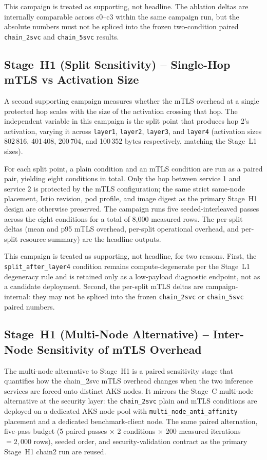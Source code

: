 This campaign is treated as supporting, not headline. The ablation deltas are internally
comparable across c0--c3 within the same campaign run, but the absolute numbers must not be
spliced into the frozen two-condition paired \texttt{chain\_2svc} and \texttt{chain\_5svc}
results.

\subsection{Stage~H1 (Split Sensitivity) -- Single-Hop mTLS vs Activation Size}
\label{sec:methods-rq21-splitsens}

A second supporting campaign measures whether the mTLS overhead at a single protected hop
scales with the size of the activation crossing that hop. The independent variable in this
campaign is the split point that produces hop 2's activation, varying it across
\texttt{layer1}, \texttt{layer2}, \texttt{layer3}, and \texttt{layer4} (activation sizes
802\,816, 401\,408, 200\,704, and 100\,352 bytes respectively, matching the Stage~L1 sizes).

For each split point, a plain condition and an mTLS condition are run as a paired pair,
yielding eight conditions in total. Only the hop between service 1 and service 2 is
protected by the mTLS configuration; the same strict same-node placement, Istio revision,
pod profile, and image digest as the primary Stage~H1 design are otherwise preserved. The
campaign runs five seeded-interleaved passes across the eight conditions for a total of
8{,}000 measured rows. The per-split deltas (mean and p95 mTLS overhead, per-split operational
overhead, and per-split resource summary) are the headline outputs.

This campaign is treated as supporting, not headline, for two reasons. First, the
\texttt{split\_after\_layer4} condition remains compute-degenerate per the Stage~L1
degeneracy rule and is retained only as a low-payload diagnostic endpoint, not as a
candidate deployment. Second, the per-split mTLS deltas are campaign-internal: they may not
be spliced into the frozen \texttt{chain\_2svc} or \texttt{chain\_5svc} paired numbers.

\subsection{Stage~H1 (Multi-Node Alternative) -- Inter-Node Sensitivity of mTLS Overhead}
\label{sec:methods-rq21b}

The multi-node alternative to Stage~H1 is a paired sensitivity stage that quantifies how the
chain\_2svc mTLS overhead changes when the two inference services are forced onto distinct
AKS nodes. It mirrors the Stage~C multi-node alternative at the security layer: the
\texttt{chain\_2svc} plain and mTLS conditions are deployed on a dedicated AKS node pool with
\texttt{multi\_node\_anti\_affinity} placement and a dedicated benchmark-client node. The same
paired alternation, five-pass budget
(5 paired passes $\times$ 2 conditions $\times$ 200 measured iterations $= 2{,}000$ rows),
seeded order, and security-validation contract as the primary Stage~H1 chain2 run are reused.

